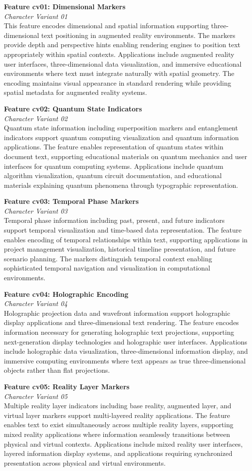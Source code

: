 \documentclass[11pt,letterpaper]{article}
\newcommand{\featurebox}[3]{%
\noindent
\colorbox{sectiongray}{%
\begin{minipage}{\dimexpr\textwidth-2\fboxsep}
\vspace{0.3em}
{\color{neutrinosblue}\large\textbf{#1}}\\[0.3em]
{\small\textit{#2}}\\[0.5em]
#3
\vspace{0.3em}
\end{minipage}}
\vspace{1em}
}
\begin{document}
\featurebox{Feature cv01: Dimensional Markers}{Character Variant 01}{%
This feature encodes dimensional and spatial information supporting three-dimensional text positioning in augmented reality environments. The markers provide depth and perspective hints enabling rendering engines to position text appropriately within spatial contexts. Applications include augmented reality user interfaces, three-dimensional data visualization, and immersive educational environments where text must integrate naturally with spatial geometry. The encoding maintains visual appearance in standard rendering while providing spatial metadata for augmented reality systems.
}

\featurebox{Feature cv02: Quantum State Indicators}{Character Variant 02}{%
Quantum state information including superposition markers and entanglement indicators support quantum computing visualization and quantum information applications. The feature enables representation of quantum states within document text, supporting educational materials on quantum mechanics and user interfaces for quantum computing systems. Applications include quantum algorithm visualization, quantum circuit documentation, and educational materials explaining quantum phenomena through typographic representation.
}

\featurebox{Feature cv03: Temporal Phase Markers}{Character Variant 03}{%
Temporal phase information including past, present, and future indicators support temporal visualization and time-based data representation. The feature enables encoding of temporal relationships within text, supporting applications in project management visualization, historical timeline presentation, and future scenario planning. The markers distinguish temporal context enabling sophisticated temporal navigation and visualization in computational environments.
}

\featurebox{Feature cv04: Holographic Encoding}{Character Variant 04}{%
Holographic projection data and wavefront information support holographic display applications and three-dimensional text rendering. The feature encodes information necessary for generating holographic text projections, supporting next-generation display technologies and holographic user interfaces. Applications include holographic data visualization, three-dimensional information display, and immersive computing environments where text appears as true three-dimensional objects rather than flat projections.
}

\featurebox{Feature cv05: Reality Layer Markers}{Character Variant 05}{%
Multiple reality layer indicators including base reality, augmented layer, and virtual layer markers support multi-layered reality applications. The feature enables text to exist simultaneously across multiple reality layers, supporting mixed reality applications where information seamlessly transitions between physical and virtual contexts. Applications include mixed reality user interfaces, layered information display systems, and applications requiring synchronized presentation across physical and virtual environments.
}
\end{document}
